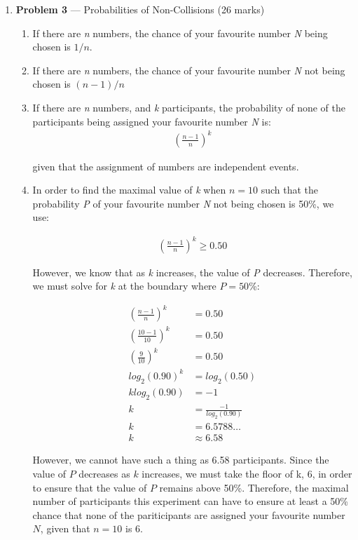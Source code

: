 \documentclass[11pt]{article}
\theoremstyle{definition}
\begin{document}
\begin{enumerate}
\item[] \textbf{Problem 3} --- Probabilities of Non-Collisions (26 marks)

\begin{enumerate}
\item If there are \textit{n} numbers, the chance of your favourite number \textit{N} being chosen is $1/n$.

\item If there are \textit{n} numbers, the chance of your favourite number \textit{N} not being chosen is $(\textit{n} - 1)/ n$

\item If there are \textit{n} numbers, and \textit{k} participants, the probability of none of the participants being assigned your favourite number \textit{N} is:
\begin{align*}
( \frac{n-1}{n})^k
\end{align*}

given that the assignment of numbers are independent events.

\item In order to find the maximal value of \textit{k} when $n = 10$ such that the probability \textit{P} of your favourite number \textit{N} not being chosen is 50\%, we use:

\begin{align*}
( \frac{n-1}{n})^k \geq 0.50
\end{align*}

However, we know that as \textit{k} increases, the value of \textit{P} decreases. Therefore, we must solve for \textit{k} at the boundary where $P = 50$\%:

\begin{align*}
( \frac{n-1}{n})^k &= 0.50 \\
( \frac{10-1}{10})^k &= 0.50 \\
( \frac{9}{10})^k &= 0.50 \\
log_2(0.90)^k &= log_2(0.50) \\
k log_2(0.90) &= -1 \\
k &= \frac{-1}{log_2(0.90)} \\
k &= 6.5788\ldots \\
k &\approx 6.58
\end{align*}

However, we cannot have such a thing as 6.58 participants. Since the value of $P$ decreases as $k$ increases, we must take the floor of k, 6, in order to ensure that the value
of $P$ remains above 50\%. Therefore, the maximal number of participants this experiment can have to ensure at least a 50\% chance that none of the pariticipants are
assigned your favourite number $N$, given that $n = 10$ is 6.


\end{enumerate}
\end{enumerate}
\end{document}
